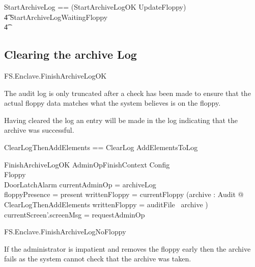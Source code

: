 \begin{zed}
        StartArchiveLog == (StartArchiveLogOK \semi UpdateFloppy) 
\\ \t4                  \lor StartArchiveLogWaitingFloppy
\\ \t4  \lor
        [~ BadAdminLogout | enclaveStatus = waitingStartAdminOp 
\\ \t6                          \land \The currentAdminOp = archiveLog 
                                ~]
\end{zed}


\subsection{Clearing the archive Log}

\begin{traceunit}{FS.Enclave.FinishArchiveLogOK}
\end{traceunit}

The audit log is only truncated after a check has been made to ensure
that the actual floppy data matches what the system believes is on the
floppy. 

Having cleared the log an entry will be made in the log indicating
that the archive was successful.

\begin{zed}
        ClearLogThenAddElements == ClearLog \semi AddElementsToLog
\end{zed}

\begin{schema}{FinishArchiveLogOK}
        AdminOpFinishContext
\also
        \Xi Config
\\      \Xi Floppy
\\      \Xi DoorLatchAlarm
\where
        \The currentAdminOp = archiveLog
\\      floppyPresence = present
\also
        writtenFloppy = currentFloppy
\also
        (\exists archive : \finset Audit @ ClearLogThenAddElements
         \land
        writtenFloppy = auditFile~ archive )
\also
        currentScreen'.screenMsg = requestAdminOp
\end{schema}


\begin{traceunit}{FS.Enclave.FinishArchiveLogNoFloppy}
\end{traceunit}

If the administrator is impatient and removes the floppy early then
the archive fails as the system cannot check that the archive was taken.

